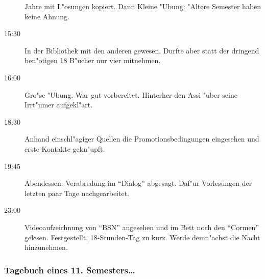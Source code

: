 \begin{description}
Jahre mit L"osungen kopiert. Dann Kleine "Ubung: "Altere Semester haben keine
Ahnung.
\item[15:30] In der Bibliothek mit den anderen gewesen. Durfte aber statt der
dringend ben"otigen 18 B"ucher nur vier mitnehmen.
\item[16:00] Gro"se "Ubung. War gut vorbereitet. Hinterher den Assi "uber seine
Irrt"umer aufgekl"art.
\item[18:30] Anhand einschl"agiger Quellen die Promotionsbedingungen eingesehen und
erste Kontakte gekn"upft.
\item[19:45] Abendessen. Verabredung im "`Dialog"' abgesagt. Daf"ur Vorlesungen
der letzten paar Tage nachgearbeitet.
\item[23:00] Videoaufzeichnung von "`BSN"' angesehen und im Bett noch den "`Cormen"'
gelesen. Festgestellt, 18-Stunden-Tag zu kurz. Werde demn"achst die Nacht
hinzunehmen.
\end{description}

\subsubsection{Tagebuch eines 11. Semesters\ldots}

